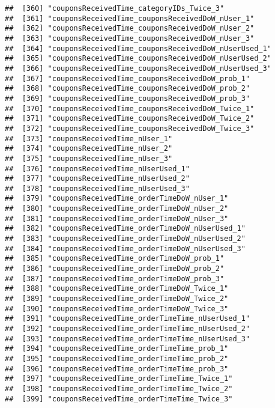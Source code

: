 \documentclass[10pt]{report}
\begin{document}
\begin{verbatim}
##  [360] "couponsReceivedTime_categoryIDs_Twice_3"              
##  [361] "couponsReceivedTime_couponsReceivedDoW_nUser_1"       
##  [362] "couponsReceivedTime_couponsReceivedDoW_nUser_2"       
##  [363] "couponsReceivedTime_couponsReceivedDoW_nUser_3"       
##  [364] "couponsReceivedTime_couponsReceivedDoW_nUserUsed_1"   
##  [365] "couponsReceivedTime_couponsReceivedDoW_nUserUsed_2"   
##  [366] "couponsReceivedTime_couponsReceivedDoW_nUserUsed_3"   
##  [367] "couponsReceivedTime_couponsReceivedDoW_prob_1"        
##  [368] "couponsReceivedTime_couponsReceivedDoW_prob_2"        
##  [369] "couponsReceivedTime_couponsReceivedDoW_prob_3"        
##  [370] "couponsReceivedTime_couponsReceivedDoW_Twice_1"       
##  [371] "couponsReceivedTime_couponsReceivedDoW_Twice_2"       
##  [372] "couponsReceivedTime_couponsReceivedDoW_Twice_3"       
##  [373] "couponsReceivedTime_nUser_1"                          
##  [374] "couponsReceivedTime_nUser_2"                          
##  [375] "couponsReceivedTime_nUser_3"                          
##  [376] "couponsReceivedTime_nUserUsed_1"                      
##  [377] "couponsReceivedTime_nUserUsed_2"                      
##  [378] "couponsReceivedTime_nUserUsed_3"                      
##  [379] "couponsReceivedTime_orderTimeDoW_nUser_1"             
##  [380] "couponsReceivedTime_orderTimeDoW_nUser_2"             
##  [381] "couponsReceivedTime_orderTimeDoW_nUser_3"             
##  [382] "couponsReceivedTime_orderTimeDoW_nUserUsed_1"         
##  [383] "couponsReceivedTime_orderTimeDoW_nUserUsed_2"         
##  [384] "couponsReceivedTime_orderTimeDoW_nUserUsed_3"         
##  [385] "couponsReceivedTime_orderTimeDoW_prob_1"              
##  [386] "couponsReceivedTime_orderTimeDoW_prob_2"              
##  [387] "couponsReceivedTime_orderTimeDoW_prob_3"              
##  [388] "couponsReceivedTime_orderTimeDoW_Twice_1"             
##  [389] "couponsReceivedTime_orderTimeDoW_Twice_2"             
##  [390] "couponsReceivedTime_orderTimeDoW_Twice_3"             
##  [391] "couponsReceivedTime_orderTimeTime_nUserUsed_1"        
##  [392] "couponsReceivedTime_orderTimeTime_nUserUsed_2"        
##  [393] "couponsReceivedTime_orderTimeTime_nUserUsed_3"        
##  [394] "couponsReceivedTime_orderTimeTime_prob_1"             
##  [395] "couponsReceivedTime_orderTimeTime_prob_2"             
##  [396] "couponsReceivedTime_orderTimeTime_prob_3"             
##  [397] "couponsReceivedTime_orderTimeTime_Twice_1"            
##  [398] "couponsReceivedTime_orderTimeTime_Twice_2"            
##  [399] "couponsReceivedTime_orderTimeTime_Twice_3"            

\end{verbatim}
\end{document}

